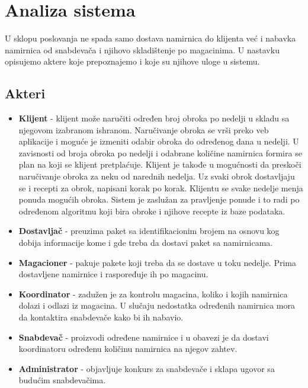 
\section{Analiza sistema}

	U sklopu poslovanja ne spada samo dostava namirnica do klijenta već i nabavka namirnica od snabdevača i njihovo skladištenje po magacinima. U nastavku opisujemo aktere koje prepoznajemo i koje su njihove uloge u sistemu.
\subsection{Akteri}
	\begin{itemize}
		\item{\textbf{Klijent}} - klijent može naručiti određen broj obroka po nedelji u skladu sa njegovom izabranom ishranom. Naručivanje obroka se vrši preko veb aplikacije i moguće je izmeniti odabir obroka do određenog dana u nedelji. U zavisnosti od broja obroka po nedelji i odabrane količine namirnica formira se plan na koji se klijent pretplaćuje. Klijent je takođe u mogućnosti da preskoči naručivanje obroka za neku od narednih nedelja. Uz svaki obrok dostavljaju se i recepti za obrok, napisani korak po korak. Klijentu se svake nedelje menja ponuda mogućih obroka. Sistem je zaslužan za pravljenje ponude i to radi po određenom algoritmu koji bira obroke i njihove recepte iz baze podataka.
		\item{\textbf{Dostavljač}} - preuzima paket sa identifikacionim brojem na osnovu kog dobija informacije kome i gde treba da dostavi paket sa namirnicama.
		\item{\textbf{Magacioner}} - pakuje pakete koji treba da se dostave u toku nedelje. Prima dostavljene namirnice i raspoređuje ih po magacinu.
		\item{\textbf{Koordinator}} - zadužen je za kontrolu magacina, koliko i kojih namirnica dolazi i odlazi iz magacina. U slučaju nedostatka određenih namirnica mora da kontaktira snabdevače kako bi ih nabavio.
		\item{\textbf{Snabdevač}} - proizvodi određene namirnice i u obavezi je da dostavi koordinatoru određenu količinu namirnica na njegov zahtev.
		\item{\textbf{Administrator}} - objavljuje konkurs za snabdevače i sklapa ugovor sa budućim snabdevačima.
		
				
	\end{itemize}

